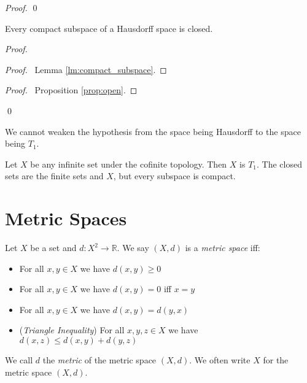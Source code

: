 \begin{proof}
\pf
{}
\qed
\end{proof}

\begin{thm}
Every compact subspace of a Hausdorff space is closed.
\end{thm}

\begin{proof}
\pf
{}
\begin{proof}
	\pf\ Lemma \ref{lm:compact_subspace}.
\end{proof}
\begin{proof}
	\pf\ Proposition \ref{prop:open}.
\end{proof}
\qed
\end{proof}

\begin{ex}
We cannot weaken the hypothesis from the space being Hausdorff to the space being $T_1$.

Let $X$ be any infinite set under the cofinite topology. Then $X$ is $T_1$. The closed sets are the finite sets and $X$, but every subspace is compact.
\end{ex}

\chapter{Metric Spaces}

\begin{df}
Let $X$ be a set and $d : X^2 \rightarrow \mathbb{R}$. We say $(X,d)$ is a \emph{metric space} iff:
\begin{itemize}
\item For all $x,y \in X$ we have $d(x,y) \geq 0$
\item For all $x,y \in X$ we have $d(x,y) = 0$ iff $x = y$
\item For all $x,y \in X$ we have $d(x,y) = d(y,x)$
\item (\emph{Triangle Inequality}) For all $x,y,z \in X$ we have $d(x,z) \leq d(x,y) + d(y,z)$
\end{itemize}
We call $d$ the \emph{metric} of the metric space $(X,d)$. We often write $X$ for the metric space $(X,d)$.
\end{df}

